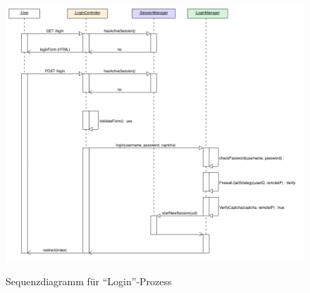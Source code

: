 \documentclass[12pt,DIV14,BCOR10mm,a4paper,parskip=half-,headsepline,headinclude,english,ngerman,bibliography=totocnumbered]{scrreprt}
\begin{document}
\begin{appendices}
\begin{figure}[!htb]
	\hspace*{-1cm}
	\includegraphics[width=0.83\paperwidth]{resources/loginseq_diagram.png}
	\label{architecture:loginseq_diagram}
	\caption{Sequenzdiagramm für \enquote{Login}-Prozess}
\end{figure}

\end{appendices}
\end{document}
